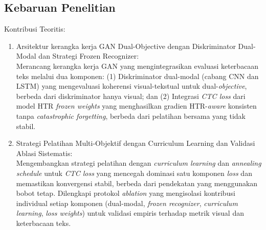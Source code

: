 \documentclass[12pt,a4paper]{book}
\begin{document}


\vspace{0.8em}
\subsection{Kebaruan Penelitian}
\label{subsec:kebaruan}

Kontribusi Teoritis:
\begin{enumerate}[label=\arabic*., leftmargin=1cm]
    \item Arsitektur kerangka kerja GAN Dual-Objective dengan Diskriminator Dual-Modal dan Strategi Frozen Recognizer: \\
    Merancang kerangka kerja GAN yang mengintegrasikan evaluasi keterbacaan teks melalui dua komponen: (1) Diskriminator dual-modal (cabang CNN dan LSTM) yang mengevaluasi koherensi visual-tekstual untuk dual-\textit{objective}, berbeda dari diskriminator hanya visual; dan (2) Integrasi \textit{CTC loss} dari model HTR \textit{frozen weights} yang menghasilkan gradien HTR-\textit{aware} konsisten tanpa \textit{catastrophic forgetting}, berbeda dari pelatihan bersama yang tidak stabil.

    \item Strategi Pelatihan Multi-Objektif dengan Curriculum Learning dan Validasi Ablasi Sistematis: \\
    Mengembangkan strategi pelatihan dengan \textit{curriculum learning} dan \textit{annealing schedule} untuk \textit{CTC loss} yang mencegah dominasi satu komponen \textit{loss} dan memastikan konvergensi stabil, berbeda dari pendekatan yang menggunakan bobot tetap. Dilengkapi protokol \textit{ablation} yang mengisolasi kontribusi individual setiap komponen (dual-modal, \textit{frozen recognizer}, \textit{curriculum learning}, \textit{loss weights}) untuk validasi empiris terhadap metrik visual dan keterbacaan teks.


\end{enumerate}
\end{document}
